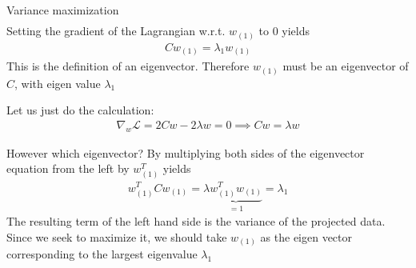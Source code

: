 \begin{parag}{Variance maximization}
\begin{align*}
	\end{align*}
	Setting the gradient of the Lagrangian w.r.t. $w_{\left(1\right)}$ to $0$ yields 
	\begin{align*} 
		Cw_{\left(1\right)} =  \lambda_1 w_{\left(1\right)}
	\end{align*}
	This is the definition of an eigenvector. Therefore $w_{\left(1\right)}$ must be an eigenvector of $C$, with eigen value $\lambda_1$
	\begin{framedremark}
		Let us just do the calculation:
		\begin{align*} 
			\nabla_{w} \mathcal{L} = 2Cw - 2\lambda w =  0 \implies Cw =  \lambda w
		\end{align*}
	\end{framedremark}
	However which eigenvector? By multiplying both sides of the eigenvector equation from the left by $w_{\left(1\right)}^{T}$ yields 
	\begin{align*} 
		w_{\left(1\right)}^{T}Cw_{\left(1\right)} =  \lambda \underbrace{w_{\left(1\right)}^{T}w_{\left(1\right)}}_{= 1} = \lambda_1
	\end{align*}
	The resulting term of the left hand side is the variance of the projected data. Since we seek to maximize it, we should take $w_{\left(1\right)}$ as the eigen vector corresponding to the largest eigenvalue $\lambda_1$
\end{parag}

